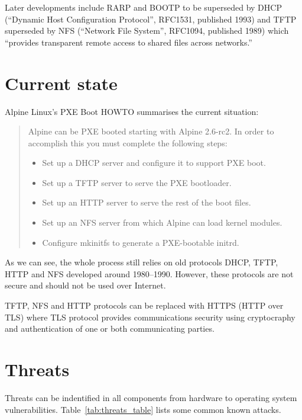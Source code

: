 Later developments include RARP and BOOTP to be superseded by DHCP
(``Dynamic Host Configuration Protocol'', RFC1531, published
1993\cite{RFC1531}) and TFTP superseded by NFS (``Network File
System'', RFC1094, published 1989\cite{RFC1094}) which ``provides
transparent remote access to shared files across
networks.''\cite{RFC1094}


\section{Current state}

Alpine Linux's PXE Boot HOWTO\cite{alpine-pxe-boot-howto} summarises
the current situation:

\begin{quote}
Alpine can be PXE booted starting with Alpine 2.6-rc2. In order to
accomplish this you must complete the following steps:

\begin{itemize}
\item Set up a DHCP server and configure it to support PXE boot.
\item Set up a TFTP server to serve the PXE bootloader.
\item Set up an HTTP server to serve the rest of the boot files.
\item Set up an NFS server from which Alpine can load kernel modules.
\item Configure mkinitfs to generate a PXE-bootable initrd.
\end{itemize}
\end{quote}

As we can see, the whole process still relies on old protocols DHCP,
TFTP, HTTP and NFS developed around 1980--1990. However, these
protocols are not secure and should not be used over Internet.

TFTP, NFS and HTTP protocols can be replaced with HTTPS (HTTP over
TLS) where TLS protocol provides communications security using
cryptocraphy and authentication of one or both communicating parties.


\section{Threats}

Threats can be indentified in all components from hardware to operating
system vulnerabilities. Table~\ref{tab:threats_table} lists some common
known attacks.

